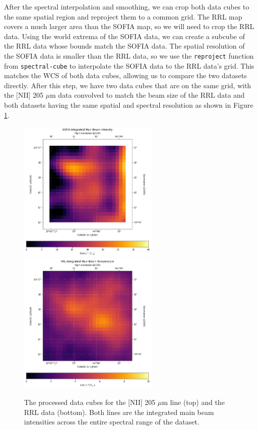 After the spectral interpolation and smoothing, we can crop both data cubes to the same spatial region and reproject them to a common grid.
The RRL map covers a much larger area than the SOFIA map, so we will need to crop the RRL data.
Using the world extrema of the SOFIA data, we can create a subcube of the RRL data whose bounds match the SOFIA data.
The spatial resolution of the SOFIA data is smaller than the RRL data, so we use the \texttt{reproject} function from \texttt{spectral-cube} to interpolate the SOFIA data to the RRL data's grid.
This matches the WCS of both data cubes, allowing us to compare the two datasets directly.
After this step, we have two data cubes that are on the same grid, with the [NII] 205 $\mu$m data convolved to match the beam size of the RRL data and both datasets having the same spatial and spectral resolution as shown in Figure \ref{carina/fig:processed_data}.

\begin{figure}[t]
    \centering
    \includegraphics[width=0.6\textwidth]{figs/carina/final_NII.png}
    \includegraphics[width=0.6\textwidth]{figs/carina/final_RRL.png}
    \caption[Preprocessed Data Cubes for {[}NII{]} and RRLs in Carina Nebula]{
        The processed data cubes for the [NII] 205 $\mu$m line (top) and the RRL data (bottom).
        Both lines are the integrated main beam intensities across the entire spectral range of the dataset.
        }
    \label{carina/fig:processed_data}
\end{figure}

